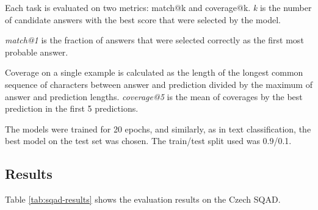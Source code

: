 \documentclass[
  printed, %
  color,   %
  table,   %
  oneside, %
  lof,     %
  lot,     %
]{fithesis3}
\begin{document}
Each task is evaluated on two metrics: match@k and coverage@k. \textit{k} is the number of candidate answers with the best score that were selected by the model.

\textit{match@1} is the fraction of answers that were selected correctly as the first most probable answer.

Coverage on a single example is calculated as the length of the longest common sequence of characters between answer and prediction divided by the maximum of answer and prediction lengths. \textit{coverage@5} is the mean of coverages by the best prediction in the first 5 predictions.


The models were trained for 20 epochs, and similarly, as in text classification, the best model on the test set was chosen. The train/test split used was 0.9/0.1. 


\subsection{Results}

Table \ref{tab:sqad-results} shows the evaluation results on the Czech SQAD. 
\end{document}
